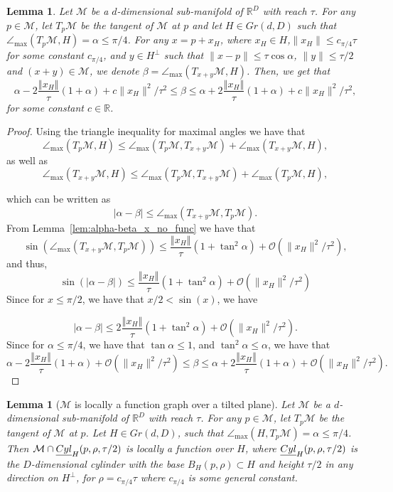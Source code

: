 \documentclass[12pt]{article}
\newtheorem{Lemma}[Theorem]{Lemma}
\theoremstyle{remark}
\newcommand{\RR}{\mathbb{R}}
\newcommand{\MM}{\mathcal{M}}
\newcommand{\OO}{\mathcal{O}}
\newcommand{\norm}[1]{\left\Vert #1 \right\Vert}
\newcommand{\maxangle}{\angle_{\max}}
\begin{document}
\begin{appendices}
\begin{Lemma}\label{lem:alpha_beta_x_no_func}
	Let $\MM$ be a $d$-dimensional sub-manifold of $\RR^D$ with reach $\tau$. For any $p \in \MM$, let $T_{p}\MM$ be the tangent of $\MM$ at $p$ and let $ H\in Gr(d, D) $ such that $ \maxangle(T_p\MM, H) = \alpha\leq \pi/4 $.
	For any $x = p + x_H$, where $x_H\in H$,$\|x_H\|\leq c_{\pi/4}\tau$ for some constant $c_{\pi/4}$, and $y\in H^\perp$  such that $\|x-p\|\leq \tau \cos \alpha$, $\|y\| \leq \tau/2$ and $(x + y)\in \MM$, we denote $ \beta = \maxangle(T_{x+y}\MM, H) $.
	Then, we get that
        \[
      \alpha- 2\frac{\norm{x_H}}{\tau}(1 + \alpha)  +c\|x_H\|^2/\tau^2 \leq \beta \leq \alpha+ 2\frac{\norm{x_H}}{\tau}(1 + \alpha)  +c\|x_H\|^2/\tau^2
	 ,\]
  for some constant $c\in \RR$.

\end{Lemma}
\begin{proof}
	Using the triangle inequality for maximal angles we have that 
	\[
	\maxangle(T_p \MM, H) \leq \maxangle(T_p \MM,T_{x+y} \MM)+\maxangle(T_{x+y} \MM,H),\]
 as well as
	\[ \maxangle(T_{x+y} \MM,H)
	 \leq \maxangle(T_p \MM,T_{x+y} \MM)+
  \maxangle(T_p \MM, H),\]

 which can be written as 
	\[
	|\alpha - \beta| \leq \maxangle(T_{x+y} \MM, T_p \MM)
	.\]
	From Lemma~\ref{lem:alpha-beta_x_no_func} we have that 
	\[
	\sin(\maxangle (T_{x+y}\MM, T_{p}\MM)) \leq \frac{\norm{x_H}}{\tau}(1 + \tan^2 \alpha)  +\OO(\|x_H\|^2/\tau^2)
	,\]
	and thus, 
	\[
	\sin(|\alpha - \beta|) \leq \frac{\norm{x_H}}{\tau}(1 + \tan^2 \alpha)  +\OO(\|x_H\|^2/\tau^2)
	\]
	Since for $x\leq \pi/2$, we have that $x/2<\sin(x)$, we have 
	
	\[
	|\alpha - \beta| \leq 2\frac{\norm{x_H}}{\tau}(1 + \tan^2 \alpha)  +\OO(\|x_H\|^2/\tau^2)
	.\]
	Since for $\alpha \leq \pi/4$, we have that $\tan \alpha \leq 1$, and $\tan^2\alpha \leq \alpha$, we have that 
    \[
      \alpha- 2\frac{\norm{x_H}}{\tau}(1 + \alpha)  +\OO(\|x_H\|^2/\tau^2) \leq \beta \leq \alpha+ 2\frac{\norm{x_H}}{\tau}(1 + \alpha)  +\OO(\|x_H\|^2/\tau^2)
	.\]

\end{proof}



\begin{Lemma} [$\MM$ is locally a function graph over a tilted plane]\label{lem:M_is_locally_a_fuinction_clean}
Let $\MM$ be a $d$-dimensional sub-manifold of $\RR^D$ with reach $\tau$. For any $p \in \MM$, let $T_{p}\MM$ be the tangent of $\MM$ at $p$. Let $H \in Gr(d,D)$, such that $\maxangle(H,T_p\MM) = \alpha \leq \pi/4$.  
Then $\MM \cap \emph{Cyl}_H(p,\rho, \tau/2)$ is locally a function over $H$, where $\emph{Cyl}_H(p,\rho, \tau/2)$ is the $D$-dimensional cylinder with the base $B_H(p, \rho)\subset H$ and height $\tau/2$ in any direction on $H^\perp$, for $\rho = c_{\pi/4}\tau$ where $c_{\pi/4}$ is some general constant. 


\end{Lemma}
\end{appendices}
\end{document}
